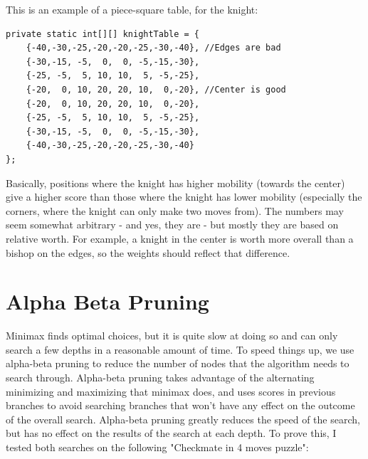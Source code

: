 \documentclass[10pt]{article}
\begin{document}
This is an example of a piece-square table, for the knight:

\begin{lstlisting}
private static int[][] knightTable = {
	{-40,-30,-25,-20,-20,-25,-30,-40}, //Edges are bad
	{-30,-15, -5,  0,  0, -5,-15,-30},
	{-25, -5,  5, 10, 10,  5, -5,-25},
	{-20,  0, 10, 20, 20, 10,  0,-20}, //Center is good
	{-20,  0, 10, 20, 20, 10,  0,-20},
	{-25, -5,  5, 10, 10,  5, -5,-25},
	{-30,-15, -5,  0,  0, -5,-15,-30},
	{-40,-30,-25,-20,-20,-25,-30,-40}
};
\end{lstlisting}

Basically, positions where the knight has higher mobility (towards the center) give a higher score than those where the knight has lower mobility (especially the corners, where the knight can only make two moves from). The numbers may seem somewhat arbitrary - and yes, they are - but mostly they are based on relative worth. For example, a knight in the center is worth more overall than a bishop on the edges, so the weights should reflect that difference.

\section{Alpha Beta Pruning}

Minimax finds optimal choices, but it is quite slow at doing so and can only search a few depths in a reasonable amount of time. To speed things up, we use alpha-beta pruning to reduce the number of nodes that the algorithm needs to search through. Alpha-beta pruning takes advantage of the alternating minimizing and maximizing that minimax does, and uses scores in previous branches to avoid searching branches that won't have any effect on the outcome of the overall search. Alpha-beta pruning greatly reduces the speed of the search, but has no effect on the results of the search at each depth. To prove this, I tested both searches on the following "Checkmate in 4 moves puzzle":
\end{document}
